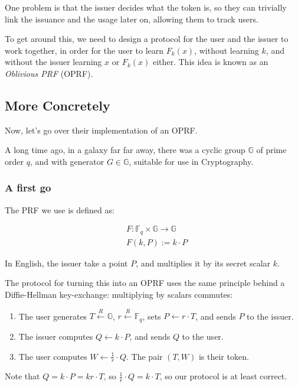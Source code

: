 \documentclass[9pt, a4paper]{article}
\begin{document}
One problem is that the issuer decides what the token is, so they
can trivially link the issuance and the usage later on, allowing
them to track users.

To get around this, we need to design a protocol for the user
and the issuer to work together, in order for the user to learn $F_k(x)$,
without learning $k$, and without the issuer learning $x$ or $F_k(x)$ either.
This idea is known as an \textit{Oblivious PRF} (OPRF).

\subsection{More Concretely}

Now, let's go over their implementation of an OPRF.

A long time ago, in a galaxy far far away, there was a cyclic group
$\mathbb{G}$ of prime order $q$, and with generator $G \in \mathbb{G}$,
suitable for use in Cryptography.

\subsubsection{A first go}

The PRF we use is defined as:

$$
\begin{aligned}
&F : \mathbb{F}_q \times \mathbb{G} \to \mathbb{G}\\
&F(k, P) := k \cdot P
\end{aligned}
$$

In English, the issuer take a point $P$, and multiplies it by its
secret scalar $k$.

The protocol for turning this into an OPRF uses the same principle
behind a Diffie-Hellman key-exchange: multiplying by scalars commutes:

\begin{enumerate}
    \item The user generates $T \xleftarrow{R} \mathbb{G}$,
          $r \xleftarrow{R} \mathbb{F}_q$, sets $P \gets r \cdot T$, and sends
          $P$ to the issuer.
    \item The issuer computes $Q \gets k \cdot P$, and sends $Q$ to the user.
    \item The user computes $W \gets \frac{1}{r} \cdot Q$. The pair $(T, W)$ is their token.
\end{enumerate}

Note that $Q = k \cdot P = kr \cdot T$, so $\frac{1}{r} \cdot Q = k \cdot T$,
so our protocol is at least correct.
\end{document}

